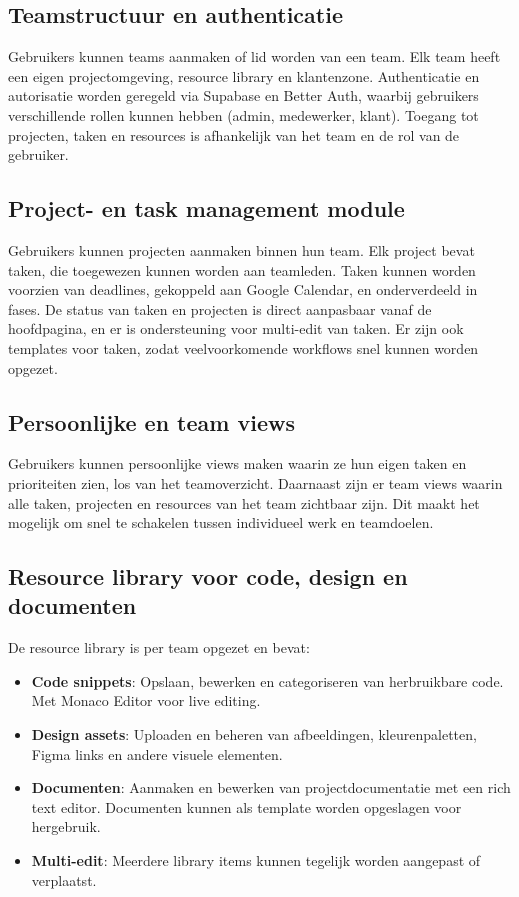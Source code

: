 \subsection{Teamstructuur en authenticatie}
Gebruikers kunnen teams aanmaken of lid worden van een team. Elk team heeft een eigen projectomgeving, resource library en klantenzone. Authenticatie en autorisatie worden geregeld via Supabase en Better Auth, waarbij gebruikers verschillende rollen kunnen hebben (admin, medewerker, klant). Toegang tot projecten, taken en resources is afhankelijk van het team en de rol van de gebruiker.

\subsection{Project- en task management module}
Gebruikers kunnen projecten aanmaken binnen hun team. Elk project bevat taken, die toegewezen kunnen worden aan teamleden. Taken kunnen worden voorzien van deadlines, gekoppeld aan Google Calendar, en onderverdeeld in fases. De status van taken en projecten is direct aanpasbaar vanaf de hoofdpagina, en er is ondersteuning voor multi-edit van taken. Er zijn ook templates voor taken, zodat veelvoorkomende workflows snel kunnen worden opgezet.

\subsection{Persoonlijke en team views}
Gebruikers kunnen persoonlijke views maken waarin ze hun eigen taken en prioriteiten zien, los van het teamoverzicht. Daarnaast zijn er team views waarin alle taken, projecten en resources van het team zichtbaar zijn. Dit maakt het mogelijk om snel te schakelen tussen individueel werk en teamdoelen.

\subsection{Resource library voor code, design en documenten}
De resource library is per team opgezet en bevat:
\begin{itemize}
    \item \textbf{Code snippets}: Opslaan, bewerken en categoriseren van herbruikbare code. Met Monaco Editor voor live editing.
    \item \textbf{Design assets}: Uploaden en beheren van afbeeldingen, kleurenpaletten, Figma links en andere visuele elementen.
    \item \textbf{Documenten}: Aanmaken en bewerken van projectdocumentatie met een rich text editor. Documenten kunnen als template worden opgeslagen voor hergebruik.
    \item \textbf{Multi-edit}: Meerdere library items kunnen tegelijk worden aangepast of verplaatst.
\end{itemize}

